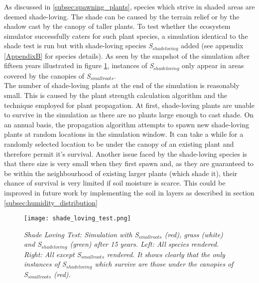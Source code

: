 As discussed in \ref{subsec:spawning_plants}, species which strive in shaded areas are deemed shade-loving. The shade can be caused by the terrain relief or by the shadow cast by the canopy of taller plants. To test whether the ecosystem simulator successfully caters for such plant species, a simulation identical to the shade test is run but with shade-loving species \textit{S$_{shadeloving}$} added (see appendix \ref{AppendixB} for species details). As seen by the snapshot of the simulation after fifteen years illustrated in figure \ref{fig:shade_loving_test}, instances of \textit{S$_{shadeloving}$} only appear in areas covered by the canopies of \textit{S$_{smallroots}$}.\\
The number of shade-loving plants at the end of the simulation is reasonably small. This is caused by the plant strength calculation algorithm and the technique employed for plant propagation. At first, shade-loving plants are unable to survive in the simulation as there are no plants large enough to cast shade. On an annual basis, the propagation algorithm attempts to spawn new shade-loving plants at random locations in the simulation window. It can take a while for a randomly selected location to be under the canopy of an existing plant and therefore permit it's survival. Another issue faced by the shade-loving species is that there size is very small when they first spawn and, as they are guaranteed to be within the neighbourhood of existing larger plants (which shade it), their chance of survival is very limited if soil moisture is scarce. This could be improved in future work by implementing the soil in layers as described in section \ref{subsec:humidity_distribution}

\begin{figure}
\center
	\texttt{[image: shade\_loving\_test.png]}
	\caption{ \textit{Shade Loving Test: Simulation with \textit{S$_{smallroots}$} (red), grass (white) and \textit{S$_{shadeloving}$} (green) after 15 years. Left: All species rendered. Right: All except \textit{S$_{smallroots}$} rendered. It shows clearly that the only instances of \textit{S$_{shadeloving}$} which survive are those under the canopies of \textit{S$_{smallroots}$} (red).}}
	\label{fig:shade_loving_test}
\end{figure}
